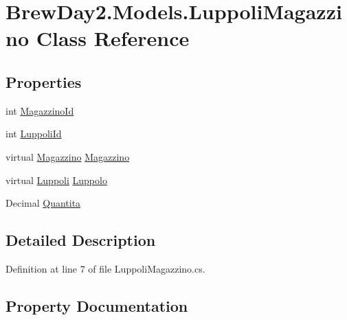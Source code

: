 \hypertarget{class_brew_day2_1_1_models_1_1_luppoli_magazzino}{}\section{Brew\+Day2.\+Models.\+Luppoli\+Magazzino Class Reference}
\label{class_brew_day2_1_1_models_1_1_luppoli_magazzino}
\subsection*{Properties}
\begin{DoxyCompactItemize}
\item 
int \mbox{\hyperlink{class_brew_day2_1_1_models_1_1_luppoli_magazzino_a8e14651a7195faf94f277199e4bff982}{Magazzino\+Id}}
\item 
int \mbox{\hyperlink{class_brew_day2_1_1_models_1_1_luppoli_magazzino_ac56c6c23c73644bf39e69a35c0807909}{Luppoli\+Id}}
\item 
virtual \mbox{\hyperlink{class_brew_day2_1_1_models_1_1_magazzino}{Magazzino}} \mbox{\hyperlink{class_brew_day2_1_1_models_1_1_luppoli_magazzino_a2a15117e56f314e6a87a43f66afa1c8f}{Magazzino}}
\item 
virtual \mbox{\hyperlink{class_brew_day2_1_1_models_1_1_luppoli}{Luppoli}} \mbox{\hyperlink{class_brew_day2_1_1_models_1_1_luppoli_magazzino_a332e7b2f27370d918352b09833617d5e}{Luppolo}}
\item 
Decimal \mbox{\hyperlink{class_brew_day2_1_1_models_1_1_luppoli_magazzino_a8a72c41477527027ca80c173462f9fc4}{Quantita}}
\end{DoxyCompactItemize}


\subsection{Detailed Description}


Definition at line 7 of file Luppoli\+Magazzino.\+cs.



\subsection{Property Documentation}
\mbox{\label{class_brew_day2_1_1_models_1_1_luppoli_magazzino_ac56c6c23c73644bf39e69a35c0807909}} 
